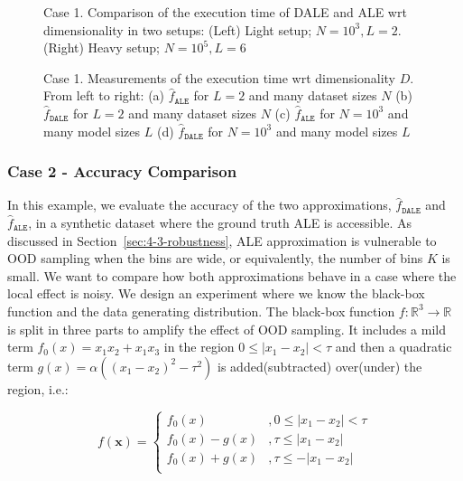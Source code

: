 \documentclass[wcp]{jmlr}
\newcommand{\dale}{\hat{f}_{\mathtt{DALE}}}
\newcommand{\R}{\mathbb{R}}
\begin{document}
\begin{figure}[h]
  \centering
  \resizebox{.4\columnwidth}{!}{}
  \resizebox{.43\columnwidth}{!}{}
  \caption[Case-1-fig-1]{Case 1. Comparison of the execution time of DALE and ALE wrt dimensionality in two setups: (Left) Light setup; \(N=10^3, L=2\).  (Right) Heavy setup; \(N=10^5, L=6\)}
  \label{fig:case-1-plots-1}
\end{figure}

\begin{figure}[h]
  \centering
  \resizebox{.23\columnwidth}{!}{}
  \resizebox{.23\columnwidth}{!}{}
  \resizebox{.23\columnwidth}{!}{}
  \resizebox{.23\columnwidth}{!}{}
  \caption[Case-1-fig-2]{
    Case 1. Measurements of the execution time wrt dimensionality \(D\). From left to right:
    (a) \(\hat{f}_{\mathtt{ALE}}\) for \(L = 2\) and many dataset sizes \(N\)
    (b) \(\dale\) for \(L = 2\) and many dataset sizes \(N\)
    (c) \(\hat{f}_{\mathtt{ALE}}\) for \(N = 10^3\) and many model sizes \(L\)
    (d) \(\dale\) for \(N = 10^3\) and many model sizes \(L\)
  }
  \label{fig:case-1-plots-2}
\end{figure}


\subsubsection{Case 2 - Accuracy Comparison}
\label{sec:example2}

In this example, we evaluate the accuracy of the two approximations, \(\dale\) and \(\hat{f}_{\mathtt{ALE}}\), in a synthetic dataset where the ground truth ALE is accessible. As discussed in Section~\ref{sec:4-3-robustness}, ALE approximation is vulnerable to OOD sampling when the bins are wide, or equivalently, the number of bins \(K\) is small. We want to compare how both approximations behave in a case where the local effect is noisy.
%
We design an experiment where we know the black-box function and the data generating distribution. The black-box function \(f:\R^3 \rightarrow \R\) is split in three parts to amplify the effect of OOD sampling. It includes a mild term \( f_0(x) = x_1x_2 + x_1x_3 \) in the region \( 0 \leq |x_1 - x_2| < \tau \) and then a quadratic term \(g(x) = \alpha ((x_1 - x_2)^2 - \tau^2)\) is added(subtracted) over(under) the region, i.e.:

\begin{equation} \label{eq:example-2-mapping} f(\mathbf{x}) =
  \begin{cases} f_0(x) & , 0 \leq |x_1 - x_2| < \tau \\ f_0(x) - g(x) & , \tau \leq |x_1 - x_2| \\ f_0(x) + g(x) & , \tau \leq - |x_1 - x_2| \\
  \end{cases}
\end{equation}
\end{document}
